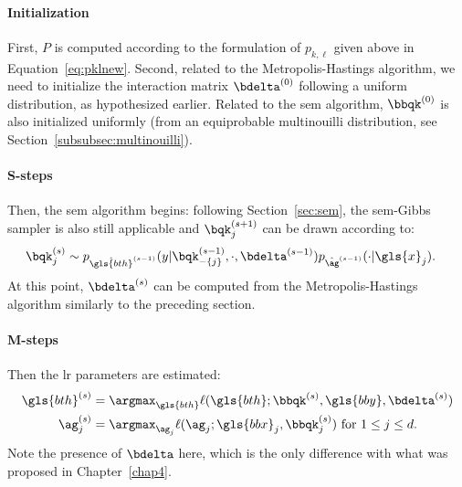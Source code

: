 \paragraph{Initialization}

First, $P$ is computed according to the formulation of $p_{k,\ell}$ given above in Equation~\eqref{eq:pklnew}.
Second, related to the Metropolis-Hastings algorithm, we need to initialize the interaction matrix $\bdelta^{(0)}$ following a uniform distribution, as hypothesized earlier. Related to the \gls{sem} algorithm, $\bbqk^{(0)}$ is also initialized uniformly (from an equiprobable multinouilli distribution, see Section~\ref{subsubsec:multinouilli}).

\paragraph{S-steps}

Then, the \gls{sem} algorithm begins: following Section~\ref{sec:sem}, the \gls{sem}-Gibbs sampler is also still applicable and $\bqk_j^{(s+1)}$ can be drawn according to: 
\begin{align*}
\bqk_j^{(s)} & \sim p_{\hat{\gls{bth}}^{(s-1)}}(y | \bqk_{-\{j\}}^{(s-1)}, \cdot, \bdelta^{(s-1)}) p_{\hat{\ag}^{(s-1)}}(\cdot | \gls{x}_j).
\end{align*}
At this point, $\bdelta^{(s)}$ can be computed from the Metropolis-Hastings algorithm similarly to the preceding section.

\paragraph{M-steps}

Then the \gls{lr} parameters are estimated:
\begin{align*}
{\gls{bth}}^{(s)} & = \argmax_{\gls{bth}} \ell(\gls{bth} ; \bbqk^{(s)}, \gls{bby}, \bdelta^{(s)}) \\
{\ag}_j^{(s)} & = \argmax_{\ag_j} \ell(\ag_j ; \gls{bbx}_j, \bbqk^{(s)}_j) \text{ for } 1 \leq j \leq d.
\end{align*}
Note the presence of $\bdelta$ here, which is the only difference with what was proposed in Chapter~\ref{chap4}.

